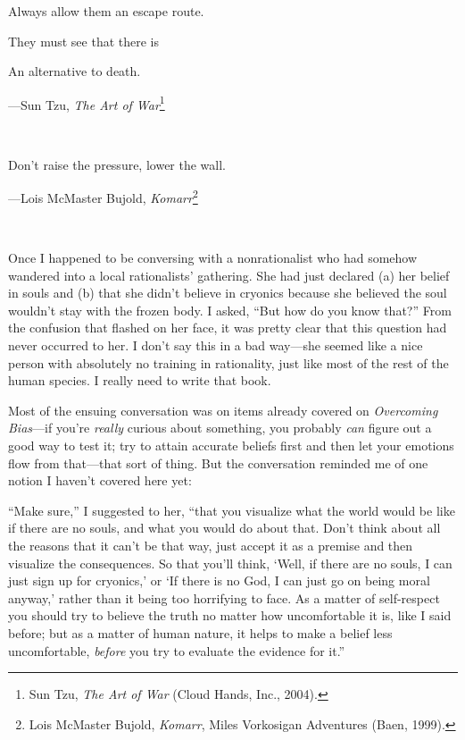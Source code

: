 {
 Always allow them an escape route.}

{
 They must see that there is}

{
 An alternative to death.}

{\raggedleft
 {}---Sun Tzu, \textit{The Art of War}\footnote{Sun Tzu, \textit{The Art of War} (Cloud Hands, Inc., 2004).}
\par}


\bigskip

{
 ~}

{
 Don't raise the pressure, lower the wall.}

{\raggedleft
 {}---Lois McMaster Bujold, \textit{Komarr}\footnote{Lois McMaster Bujold, \textit{Komarr}, Miles Vorkosigan
Adventures (Baen, 1999).}
\par}


\bigskip

{
 ~}

{
 Once I happened to be conversing with a nonrationalist who had
somehow wandered into a local rationalists' gathering.
She had just declared (a) her belief in souls and (b) that she
didn't believe in cryonics because she believed the
soul wouldn't stay with the frozen body. I asked,
``But how do you know that?'' From
the confusion that flashed on her face, it was pretty clear that this
question had never occurred to her. I don't say this in
a bad way---she seemed like a nice person with absolutely no training
in rationality, just like most of the rest of the human species. I
really need to write that book.}

{
 Most of the ensuing conversation was on items already covered on
\textit{Overcoming Bias}{}---if you're \textit{really}
curious about something, you probably \textit{can} figure out a good
way to test it; try to attain accurate beliefs first and then let your
emotions flow from that---that sort of thing. But the conversation
reminded me of one notion I haven't covered here yet:}

{
 ``Make sure,'' I suggested to
her, ``that you visualize what the world would be like
if there are no souls, and what you would do about that.
Don't think about all the reasons that it
can't be that way, just accept it as a premise and then
visualize the consequences. So that you'll think,
`Well, if there are no souls, I can just sign up for
cryonics,' or `If there is no God, I can
just go on being moral anyway,' rather than it being
too horrifying to face. As a matter of self-respect you should try to
believe the truth no matter how uncomfortable it is, like I said
before; but as a matter of human nature, it helps to make a belief less
uncomfortable, \textit{before} you try to evaluate the evidence for
it.''}

